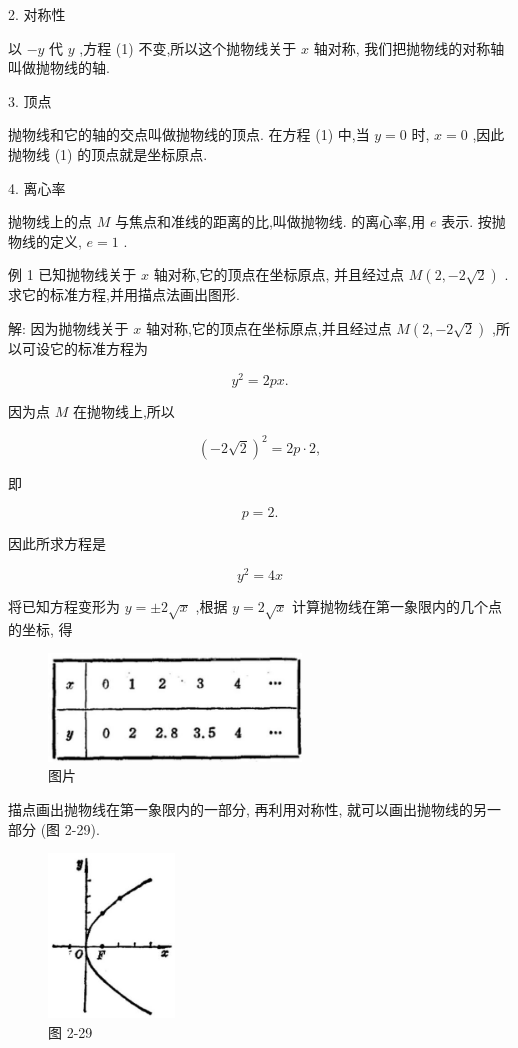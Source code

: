 \documentclass[lang=cn,newtx,10pt,scheme=chinese]{elegantbook}
\begin{document}
2. 对称性

以 \(- y\) 代 \(y\) ,方程 (1) 不变,所以这个抛物线关于 \(x\) 轴对称, 我们把抛物线的对称轴叫做抛物线的轴.

3. 顶点

抛物线和它的轴的交点叫做抛物线的顶点. 在方程 (1) 中,当 \(y = 0\) 时, \(x = 0\) ,因此抛物线 (1) 的顶点就是坐标原点.

4. 离心率

抛物线上的点 \(M\) 与焦点和准线的距离的比,叫做抛物线. 的离心率,用 \(e\) 表示. 按抛物线的定义, \(e = 1\) .

例 1 已知抛物线关于 \(x\) 轴对称,它的顶点在坐标原点, 并且经过点 \(M\left( {2, - 2\sqrt{2}}\right)\) . 求它的标准方程,并用描点法画出图形.

解: 因为抛物线关于 \(x\) 轴对称,它的顶点在坐标原点,并且经过点 \(M\left( {2, - 2\sqrt{2}}\right)\) ,所以可设它的标准方程为

\[
    {y}^{2} = {2px}\text{.}
\]

因为点 \(M\) 在抛物线上,所以

\[
    {\left( -2\sqrt{2}\right) }^{2} = {2p} \cdot 2,
\]

即

\[
  p = 2\text{.}
\]

因此所求方程是

\[
    {y}^{2} = {4x}
\]

将已知方程变形为 \(y = \pm 2\sqrt{x}\) ,根据 \(y = 2\sqrt{x}\) 计算抛物线在第一象限内的几个点的坐标, 得

\begin{figure}[h]
  \centering
  \includegraphics[max width=0.6\textwidth]{images/01912cc2-ffb6-728e-9ae7-b113ff05c64b_114_150048.jpg}
  \caption{图片}
\end{figure}

描点画出抛物线在第一象限内的一部分, 再利用对称性, 就可以画出抛物线的另一部分 (图 2-29).

\begin{figure}[h]
  \centering
  \includegraphics[max width=0.3\textwidth]{images/01912cc2-ffb6-728e-9ae7-b113ff05c64b_114_824804.jpg}
  \caption{图 2-29}
\end{figure}
\end{document}
